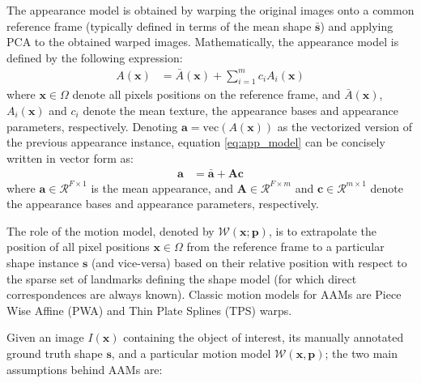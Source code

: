 The appearance model is obtained by warping the original images onto a common reference frame (typically defined in terms of the mean shape $\mathbf{\bar{s}}$) and applying PCA to the obtained warped images. Mathematically, the appearance model is defined by the following expression:
\begin{equation}
	\begin{aligned}
		A(\mathbf{x}) & = \bar{A}(\mathbf{x}) + \sum_{i=1}^m c_i A_i(\mathbf{x})
	\end{aligned}
    \label{eq:app_model}
\end{equation}
where $\mathbf{x} \in \Omega$ denote all pixels positions on the reference frame, and $\bar{A}(\mathbf{x})$, $A_i(\mathbf{x})$ and $c_i$ denote the mean texture, the appearance bases and appearance parameters, respectively. Denoting $\mathbf{a} = \text{vec}(A(\mathbf{x}))$ as the vectorized version of the previous appearance instance, equation \ref{eq:app_model} can be concisely written in vector form as:
\begin{equation}
	\begin{aligned}
		\mathbf{a} & = \mathbf{\bar{a}} + \mathbf{A} \mathbf{c}
	\end{aligned}
    \label{eq:app_model_vec}
\end{equation}
where $\mathbf{a} \in \mathcal{R}^{F \times 1}$ is the mean appearance, and $\mathbf{A} \in  \mathcal{R}^{F \times  m}$ and $\mathbf{c} \in \mathcal{R}^{m \times 1}$ denote the appearance bases and appearance parameters, respectively.

The role of the motion model, denoted by $\mathcal{W}(\mathbf{x}; \mathbf{p})$, is to extrapolate the position of all pixel positions $\mathbf{x} \in \Omega$ from the reference frame to a particular shape instance $\mathbf{s}$ (and vice-versa) based on their relative position with respect to the sparse set of landmarks defining the shape model (for which direct correspondences are always known). Classic motion models for AAMs are Piece Wise Affine (PWA) \cite{Cootes2004,Matthews2004} and Thin Plate Splines (TPS) \cite{Cootes2004,Papandreou2008} warps. 

Given an image $I(\mathbf{x})$ containing the object of interest, its manually annotated ground truth shape $\mathbf{s}$, and a particular motion model $\mathcal{W}(\mathbf{x}, \mathbf{p})$; the two main assumptions behind AAMs are:

